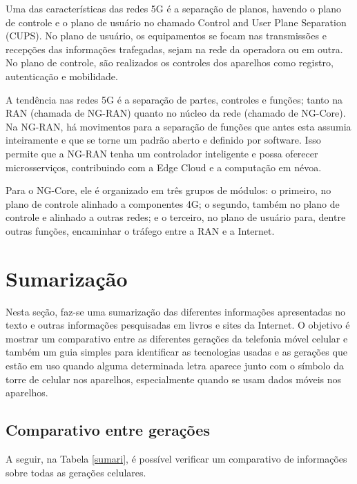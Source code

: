 \documentclass[11pt,oneside,a4paper]{abntex2}
\begin{document}
Uma das características das redes 5G é a separação de planos, havendo o plano de controle e o plano de usuário no chamado Control and User Plane Separation (CUPS). No plano de usuário, os equipamentos se focam nas transmissões e recepções das informações trafegadas, sejam na rede da operadora ou em outra. No plano de controle, são realizados os controles dos aparelhos como registro, autenticação e mobilidade.

A tendência nas redes 5G é a separação de partes, controles e funções; tanto na RAN (chamada de NG-RAN) quanto no núcleo da rede (chamado de NG-Core). Na NG-RAN, há movimentos para a separação de funções que antes esta assumia inteiramente e que se torne um padrão aberto e definido por software. Isso permite que a NG-RAN tenha um controlador inteligente e possa oferecer microsserviços, contribuindo com a Edge Cloud e a computação em névoa.

Para o NG-Core, ele é organizado em três grupos de módulos: o primeiro, no plano de controle alinhado a componentes 4G; o segundo, também no plano de controle e alinhado a outras redes; e o terceiro, no plano de usuário para, dentre outras funções, encaminhar o tráfego entre a RAN e a Internet.

\section*{Sumarização}
\label{sumarização}

Nesta seção, faz-se uma sumarização das diferentes informações apresentadas no texto e outras informações pesquisadas em livros e sites da Internet. O objetivo é mostrar um comparativo entre as diferentes gerações da telefonia móvel celular e também um guia simples para identificar as tecnologias usadas e as gerações que estão em uso quando alguma determinada letra aparece junto com o símbolo da torre de celular nos aparelhos, especialmente quando se usam dados móveis nos aparelhos.

\subsection*{Comparativo entre gerações}

A seguir, na Tabela \ref{sumari}, é possível verificar um comparativo de informações sobre todas as gerações celulares.
\end{document}
